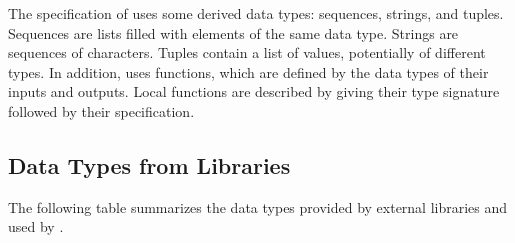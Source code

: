 \documentclass[12pt, titlepage]{article}
\begin{document}
\noindent
The specification of \projname uses some derived data types: sequences, strings, and
tuples. Sequences are lists filled with elements of the same data type. Strings
are sequences of characters. Tuples contain a list of values, potentially of
different types. In addition, \projname uses functions, which
are defined by the data types of their inputs and outputs. Local functions are
described by giving their type signature followed by their specification.

\subsection{Data Types from Libraries}

The following table summarizes the data types provided by external libraries and
used by \projname.
\end{document}
